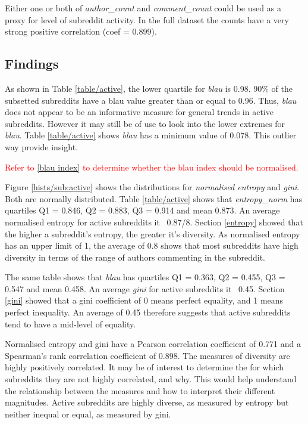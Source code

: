 Either one or both of \textit{author\_count} and \textit{comment\_count} could be used as a proxy for level of subreddit activity. In the full dataset the counts have a very strong positive correlation (coef = 0.899). 


\subsection{Findings}

As shown in Table \ref{table/active}, the lower quartile for \textit{blau} is 0.98. 90\% of the subsetted subreddits have a blau value greater than or equal to 0.96.  Thus, \textit{blau} does not appear to be an informative measure for general trends in active subreddits. However it may still be of use to look into the lower extremes for \textit{blau}. Table \ref{table/active} shows \textit{blau} has a minimum value of 0.078. This outlier way provide insight.

\textcolor{red}{Refer to \ref{blau index} to determine whether the blau index should be normalised.}

Figure \ref{hists/sub:active} shows the distributions for \textit{normalised entropy} and \textit{gini}. Both are normally distributed. Table \ref{table/active} shows that \textit{entropy\_norm} has quartiles Q1 = 0.846, Q2 = 0.883, Q3 = 0.914 and mean 0.873. An average normalised entropy for active subreddits it ~0.87/8. Section \ref{entropy} showed that the higher a subreddit's entropy, the greater it's diversity. As normalised entropy has an upper limit of 1, the average of 0.8 shows that most subreddits have high diversity in terms of the range of authors commenting in the subreddit.

The same table shows that \textit{blau} has quartiles Q1 = 0.363, Q2 = 0.455, Q3 = 0.547 and mean 0.458. An average \textit{gini} for active subreddits it ~0.45. Section \ref{gini} showed that a gini coefficient of 0 means perfect equality, and 1 means perfect inequality. An average of 0.45 therefore suggests that active subreddits tend to have a mid-level of equality.

Normalised entropy and gini have a Pearson correlation coefficient of 0.771 and a Spearman's rank correlation coefficient of 0.898. The measures of diversity are highly positively correlated. It may be of interest to determine the for which subreddits they are not highly correlated, and why. This would help understand the relationship between the measures and how to interpret their different magnitudes. Active subreddits are highly diverse, as measured by entropy but neither inequal or equal, as measured by gini.